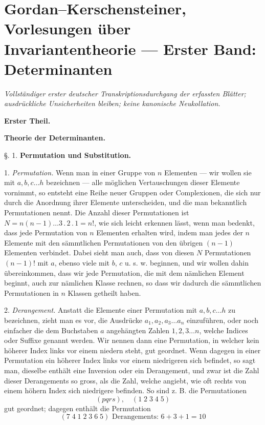 \documentclass[11pt]{article}
\providecommand{\weberpage}[1]{}
\begin{document}
\section*{Gordan--Kerschensteiner, Vorlesungen über Invariantentheorie --- Erster Band: Determinanten}
\noindent\textit{Vollständiger erster deutscher Transkriptionsdurchgang der erfassten Blätter; ausdrückliche Unsicherheiten bleiben; keine kanonische Neukollation.}\par\bigskip

\weberpage{1}

\begin{center}
\textbf{Erster Theil.}

\textbf{Theorie der Determinanten.}
\end{center}

\begin{center}
§. 1. \textbf{Permutation und Substitution.}
\end{center}

1. \textit{Permutation.} Wenn man in einer Gruppe von $n$ Elementen — wir wollen sie mit $a, b, c \dots h$ bezeichnen — alle möglichen Vertauschungen dieser Elemente vornimmt, so entsteht eine Reihe neuer Gruppen oder Complexionen, die sich nur durch die Anordnung ihrer Elemente unterscheiden, und die man bekanntlich Permutationen nennt. Die Anzahl dieser Permutationen ist $N = n(n-1)\dots 3 \, . \, 2 \, . \, 1 = n!$, wie sich leicht erkennen lässt, wenn man bedenkt, dass jede Permutation von $n$ Elementen erhalten wird, indem man jedes der $n$ Elemente mit den sämmtlichen Permutationen von den übrigen $(n-1)$ Elementen verbindet. Dabei sieht man auch, dass von diesen $N$ Permutationen $(n-1)!$ mit $a$, ebenso viele mit $b$, $c$ u. s. w. beginnen, und wir wollen dahin übereinkommen, dass wir jede Permutation, die mit dem nämlichen Element beginnt, auch zur nämlichen Klasse rechnen, so dass wir dadurch die sämmtlichen Permutationen in $n$ Klassen getheilt haben.

2. \textit{Derangement.} Anstatt die Elemente einer Permutation mit $a, b, c \dots h$ zu bezeichnen, zieht man es vor, die Ausdrücke $a_1, a_2, a_3 \dots a_n$ einzuführen, oder noch einfacher die dem Buchstaben $a$ angehängten Zahlen $1, 2, 3 \dots n$, welche Indices oder Suffixe genannt werden. Wir nennen dann eine Permutation, in welcher kein höherer Index links vor einem niedern steht, gut geordnet. Wenn dagegen in einer Permutation ein höherer Index links vor einem niedrigeren sich befindet, so sagt man, dieselbe enthält eine Inversion oder ein Derangement, und zwar ist die Zahl dieser Derangements so gross, als die Zahl, welche angiebt, wie oft rechts von einem höhern Index sich niedrigere befinden. So sind z. B. die Permutationen
\[
(pqrs), \quad (1\;2\;3\;4\;5)
\]
gut geordnet; dagegen enthält die Permutation
\[
(7\;4\;1\;2\;3\;6\;5) \text{ Derangements: } 6 + 3 + 1 = 10
\]
\end{document}
